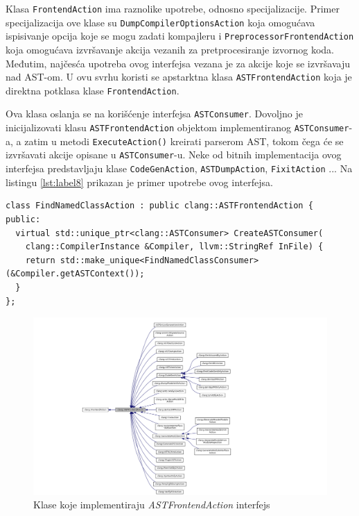 \documentclass[12pt,oneside]{memoir}
\begin{document}
Klasa \lstinline{FrontendAction} ima raznolike upotrebe, odnosno specijalizacije. Primer specijalizacija ove klase su \lstinline{DumpCompilerOptionsAction}
koja omogu\'{c}ava ispisivanje opcija koje se mogu zadati kompajleru i \lstinline{PreprocessorFrontendAction} koja omogu\'{c}ava izvr\v{s}avanje akcija vezanih za pretprocesiranje izvornog koda. Međutim, naj\v{c}es\'{c}a upotreba ovog interfejsa vezana je za akcije koje se izvr\v{s}avaju nad AST-om. U ovu svrhu koristi se apstarktna klasa \lstinline{ASTFrontendAction} koja je direktna potklasa klase \lstinline{FrontendAction}. \par
Ova klasa oslanja se na kori\v{s}\'{c}enje interfejsa \lstinline{ASTConsumer}. Dovoljno je inicijalizovati klasu \lstinline{ASTFrontendAction} objektom implementiranog \lstinline{ASTConsumer}-a, a zatim u metodi \lstinline{ExecuteAction()} kreirati parserom AST,
tokom \v{c}ega \'{c}e se izvr\v{s}avati akcije opisane u \lstinline{ASTConsumer}-u. Neke od bitnih implementacija ovog interfejsa predstavljaju klase \lstinline{CodeGenAction}, \lstinline{ASTDumpAction}, \lstinline{FixitAction} \cite{FrontendAction}...  Na listingu \ref{lst:label8} prikazan je primer upotrebe ovog interfejsa. 
\\
\begin{lstlisting}[caption={Primer upotrebe klase \lstinline{ASTFrontendAction} interfejsa \cite{ASTToolTutorial}}, label=lst:label8, captionpos=b]
class FindNamedClassAction : public clang::ASTFrontendAction {
public:
  virtual std::unique_ptr<clang::ASTConsumer> CreateASTConsumer(
    clang::CompilerInstance &Compiler, llvm::StringRef InFile) {
    return std::make_unique<FindNamedClassConsumer>(&Compiler.getASTContext());
  }
};

\end{lstlisting}


\begin{figure}[h!]
\begin{center}
\includegraphics[scale=0.4]{ASTFrontendAction.png}
\end{center}
\caption{Klase koje implementiraju \textit{ASTFrontendAction} interfejs}
\label{fig:exploded}
\end{figure}
\end{document}
